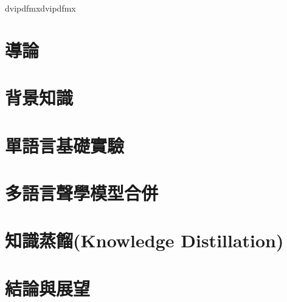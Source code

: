 \documentclass[12pt, a4paper]{ntuthesis}
\newcommand\mydvipdfmxflow{dvipdfmx}
\newcommand\myworkflow{dvipdfmx}  %
\newcommand\myworkflow{dvipdfmx}  %
\newcommand\myworkflow{pdftex}  %
\newcommand\myworkflow{dvipdfmx}  %
\begin{document}
\begin{CJK}{UTF8}{bsmi}   %

\ifx\myworkflow\mydvipdfmxflow
\fi

\CJKindent  %








\chapter{導論}
  
\chapter{背景知識}
  
\chapter{單語言基礎實驗}
  
\chapter{多語言聲學模型合併}
  
\chapter{知識蒸餾(Knowledge Distillation)}
  
\chapter{結論與展望}
  



\clearpage %
\end{CJK}  %
\end{document}
